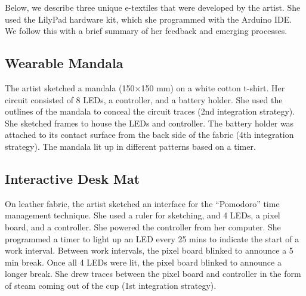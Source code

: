 \documentclass[header.tex]{subfiles}
\begin{document}
Below, we describe three unique e-textiles that were developed by the artist. She used the LilyPad hardware kit, which she programmed with the Arduino IDE. We follow this with a brief summary of her feedback and emerging processes. 




\subsection{Wearable Mandala}
The artist sketched a mandala (150$\times$150 mm) on a white cotton t-shirt. 
Her circuit consisted of 8 LEDs, a controller, and a battery holder. She used the outlines of the mandala to conceal the circuit traces (2nd integration strategy). She sketched frames to house the LEDs and controller. The battery holder was attached to its contact surface from the back side of the fabric (4th integration strategy). The mandala lit up in different patterns based on a timer. %



\subsection{Interactive Desk Mat}
On leather fabric, the artist sketched an interface for the ``Pomodoro'' time management technique. She used a ruler for sketching, and  4 LEDs, a pixel board, and a controller. She powered the controller from her computer. She programmed a timer to light up an LED every 25 mins to indicate the start of a work interval. Between work intervals, the pixel board blinked to announce a 5 min break. Once all 4 LEDs were lit, the pixel board blinked to announce a longer break.
She drew traces between the pixel board and controller in the form of steam coming out of the cup (1st integration strategy). 
\end{document}
